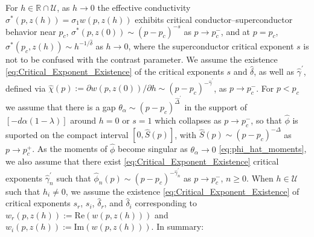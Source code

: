 \documentclass[english,12pt,jmp,graphicx]{revtex4-1}
\newcommand{\ph}{\hat{\phi}}
\newcommand{\gh}{\hat{\gamma}}
\newcommand{\Dh}{\hat{\Delta}}
\newcommand{\dha}{\hat{\delta}}
\begin{document}
For $h\in\mathbb{R}\cap\mathcal{U}$, as $h\to0$ the effective conductivity
$\sigma^*(p,z(h))=\sigma_1w(p,z(h))$ exhibits critical conductor--superconductor
behavior near $p_c$, $\sigma^*(p,z(0))\sim(p-p_c)^{-s}$ as $p\to p_c^-$, and at
$p=p_c$, $\sigma^*(p_c,z(h))\sim h^{-1/\dha}$ as $h\to0$, where the superconductor
critical exponent $s$ is not to be confused with the contrast
parameter. We assume the existence
\eqref{eq:Critical_Exponent_Existence} of the critical exponents $s$ and
$\dha$, as well as $\gh^\prime$, defined via
$\hat{\chi}(p):=\partial w(p,z(0))/\partial h\sim(p-p_c)^{-\gh^\prime}$, as $p\to p_c^-$. For
$p<p_c$ we assume that there is a gap $\theta_\alpha\sim(p-p_c)^{\Dh^\prime}$ in the 
support of $[-d\alpha(1-\lambda)]$ around $h=0$ or $s=1$ which collapses as
$p\to p_c^-$, so that $\ph$ is suported on the compact interval
$[0,\hat{S}(p)]$, with $\hat{S}(p)\sim(p-p_c)^{-\Delta}$ as $p\to p_c^+$. As the
moments of $\ph$ become singular as $\theta_\alpha\to0$
\eqref{eq:phi_hat_moments}, we also assume that there exist
\eqref{eq:Critical_Exponent_Existence} critical exponents $\gh_n^\prime$
such that $\ph_n(p)\sim(p-p_c)^{-\gh_n^\prime}$ as $p\to p_c^-$, $n\geq0$. When
$h\in\mathcal{U}$ such that $h_i\neq0$, we assume the existence
\eqref{eq:Critical_Exponent_Existence} of critical exponents $s_r$,
$s_i$, $\dha_r$, and $\dha_i$ corresponding to
$w_r(p,z(h)):=\text{Re}(w(p,z(h)))$ and $w_i(p,z(h)):=\text{Im}(w(p,z(h)))$. In summary: 
\end{document}
